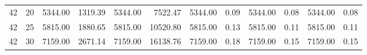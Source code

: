 \begin{table}
\begin{tabular}{@{}rrrrrrrrrrrr@{}}
42                                                                               & 20                                                                                    & 5344.00                                                                     & 1319.39                                                               & 5344.00                                                                      & 7522.47                                                                 & 5344.00                                                                     & 0.09                                                                   & 5344.00                                                                     & 0.08                                                                   & 5344.00                                                                     & 0.08                                                                   \\
42                                                                               & 25                                                                                    & 5815.00                                                                     & 1880.65                                                               & 5815.00                                                                      & 10520.80                                                                & 5815.00                                                                     & 0.13                                                                   & 5815.00                                                                     & 0.11                                                                   & 5815.00                                                                     & 0.11                                                                   \\
42                                                                               & 30                                                                                    & 7159.00                                                                     & 2671.14                                                               & 7159.00                                                                      & 16138.76                                                                & 7159.00                                                                     & 0.18                                                                   & 7159.00                                                                     & 0.15                                                                   & 7159.00                                                                     & 0.15                                                                   \\

\end{tabular}
\end{table}
